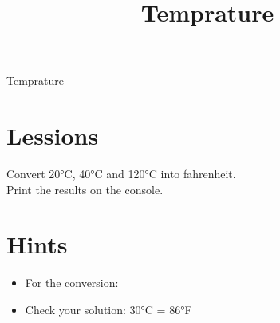 \documentclass[a4paper, 12pt]{scrartcl}
\title{Temprature}
\author{}
\date{}
\begin{document}
\raggedright {
    \Huge {
        {\selectfont
            Temprature
            \vspace{2cm}     
               
        }
    }
}
\vspace{1cm}

 \section*{Lessions}
 Convert 20°C, 40°C and 120°C into fahrenheit. \\
 Print the results on the console.
 
 \section*{Hints}
 \begin{itemize}
     \item For the conversion: %
     \item Check your solution: 30°C = 86°F
\end{itemize}
 
\end{document}
